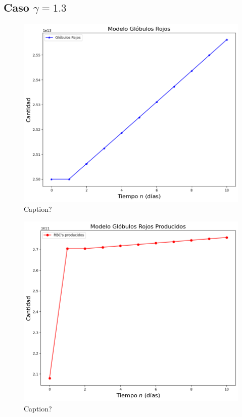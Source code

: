 \subsection{Caso $\gamma=1.3$}
\begin{figure}[H]
    \centering
    \includegraphics[scale=0.55]{figures/BaseG13RBC.png}
    \caption{Caption?}
    \label{sec:modelo:fig:G07RBC}
\end{figure}

\begin{figure}[H]
    \centering
    \includegraphics[scale=0.55]{figures/BaseG13SC.png}
    \caption{Caption?}
    \label{sec:modelo:fig:G07SC}
\end{figure}